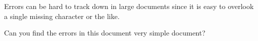 \documentclass{article}
\author{Jonas Camillus Jeppesen \\ jonascj@sdu.dk}
\date{\today}
\begin{document}
Errors can be hard to track down in large documents since it is easy to overlook a single missing character or the like.

Can you find the errors in this document very simple document?
\end{document}
